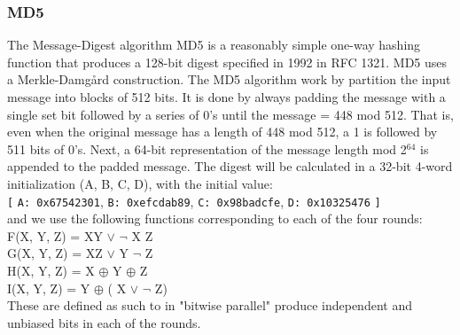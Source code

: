 \documentclass[a4paper]{article}
\begin{document}
\subsubsection{MD5}
\label{sec:org11bba75}
The Message-Digest algorithm MD5 is a reasonably simple one-way hashing function that produces a 128-bit digest specified in 1992 in RFC 1321\cite{}. MD5 uses a Merkle-Damgård construction.
The MD5 algorithm work by partition the input message into blocks of 512 bits. It is done by always padding the message with a single set bit followed by a series of 0's until the message = 448 mod 512. That is, even when the original message has a length of 448 mod 512, a 1 is followed by 511 bits of 0's.
Next, a 64-bit representation of the message length mod 2\(^{\text{64}}\) is appended to the padded message.
The digest will be calculated in a 32-bit 4-word initialization (A, B, C, D), with the initial value:\\
\texttt{[} \texttt{A: 0x67542301}, \texttt{B: 0xefcdab89}, \texttt{C: 0x98badcfe}, \texttt{D: 0x10325476} \texttt{]}\\
and we use the following functions corresponding to each of the four rounds:\\
F(X, Y, Z) = XY \(\vee\) \(\neg{}\) X Z\\
G(X, Y, Z) = XZ \(\vee\) Y \(\neg{}\) Z\\
H(X, Y, Z) = X \(\oplus\) Y \(\oplus\) Z\\
I(X, Y, Z) = Y \(\oplus\) ( X \(\vee\) \(\neg{}\) Z)\\
These are defined as such to in "bitwise parallel" produce independent and unbiased bits in each of the rounds.
\end{document}
